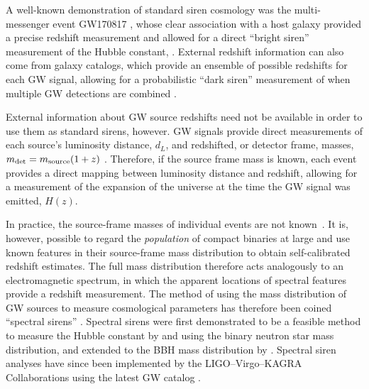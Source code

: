 \documentclass[preprint2,linenumbers]{aastex631}
\begin{document}
A well-known demonstration of standard siren cosmology was the multi-messenger event GW170817 \citep{abbott_multi-messenger_2017,coulter_swope_2017,valenti_discovery_2017,2017ApJ...848L..27T}, whose clear association with a host galaxy provided a precise redshift measurement and allowed for a direct ``bright siren'' measurement of the Hubble constant, \Ho{} \citep{abbott_gravitational-wave_2017}.
External redshift information can also come from galaxy catalogs, which provide an ensemble of possible redshifts for each \ac{GW} signal, allowing for a probabilistic ``dark siren'' measurement of \Ho{} when multiple \ac{GW} detections are combined \citep{del_pozzo_inference_2012, chen_two_2018, fishbach_standard_2019, gray_cosmological_2020, gwtc3_cosmo, gair_hitchhikers_2023}.

External information about \ac{GW} source redshifts need not be available in order to use them as standard sirens, however.
\ac{GW} signals provide direct measurements of each source's luminosity distance, $d_L$, and redshifted, or detector frame, masses, $m_{\det}= m_{\text{source}}(1+z)$ \citep[e.g.][]{chen_mass-redshift_2019}.
Therefore, if the source frame mass is known, each event provides a direct mapping between luminosity distance and redshift, allowing for a measurement of the expansion of the universe at the time the \ac{GW} signal was emitted, $H(z)$.

In practice, the source-frame masses of individual events are not known~\citep[unless tidal information is available, e.g.][]{messenger_measuring_2012, 2021PhRvD.104h3528C}.
It is, however, possible to regard the \textit{population} of compact binaries at large and use known features in their source-frame mass distribution to obtain self-calibrated redshift estimates.
The full mass distribution therefore acts analogously to an electromagnetic spectrum, in which the apparent locations of spectral features provide a redshift measurement.
The method of using the mass distribution of \ac{GW} sources to measure cosmological parameters has therefore been coined ``spectral sirens'' \citep{ezquiaga_spectral_2022}.
Spectral sirens were first demonstrated to be a feasible method to measure the Hubble constant by \cite{chernoff_gravitational_1993} and \cite{Taylor:2011fs} using the binary neutron star mass distribution, and extended to the \ac{BBH} mass distribution by \cite{farr_future_2019}. 
Spectral siren analyses have since been implemented by the LIGO--Virgo--KAGRA Collaborations using the latest \ac{GW} catalog \citep{gwtc3_cosmo}.
\end{document}
